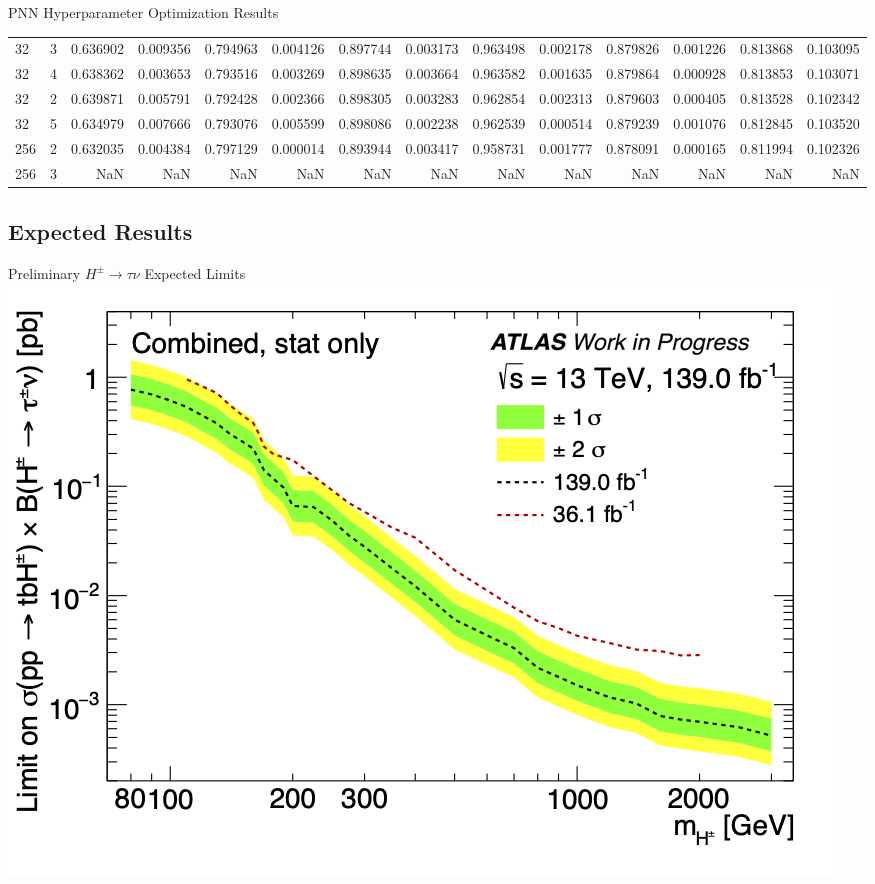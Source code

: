 \documentclass[aspectratio=169,xcolor=table]{beamer}
\begin{document}
\begin{frame}{PNN Hyperparameter Optimization Results}
\begin{table}
{\begin{tabular}{llrrrrrrrrrrrr}
        32 &     3 &  0.636902 &  0.009356 &  0.794963 &  0.004126 &  0.897744 &  0.003173 &  0.963498 &  0.002178 &  0.879826 &  0.001226 &  0.813868 &    0.103095 \\
        32 &     4 &  0.638362 &  0.003653 &  0.793516 &  0.003269 &  0.898635 &  0.003664 &  0.963582 &  0.001635 &  0.879864 &  0.000928 &  0.813853 &    0.103071 \\
        32 &     2 &  0.639871 &  0.005791 &  0.792428 &  0.002366 &  0.898305 &  0.003283 &  0.962854 &  0.002313 &  0.879603 &  0.000405 &  0.813528 &    0.102342 \\
        32 &     5 &  0.634979 &  0.007666 &  0.793076 &  0.005599 &  0.898086 &  0.002238 &  0.962539 &  0.000514 &  0.879239 &  0.001076 &  0.812845 &    0.103520 \\
       256 &     2 &  0.632035 &  0.004384 &  0.797129 &  0.000014 &  0.893944 &  0.003417 &  0.958731 &  0.001777 &  0.878091 &  0.000165 &  0.811994 &    0.102326 \\
       256 &     3 &       NaN &       NaN &       NaN &       NaN &       NaN &       NaN &       NaN &       NaN &       NaN &       NaN &       NaN &         NaN \\
      \bottomrule
      \end{tabular}}
      \end{table}
    \end{frame}

  \subsection{Expected Results}

    \begin{frame}{Preliminary $H^{\pm} \rightarrow \tau\nu$ Expected Limits}
    \centering
    \includegraphics[height=.9\textheight,keepaspectratio=true]{Limits/Combined_2021.png}
    \small
    \end{frame}
\end{document}
